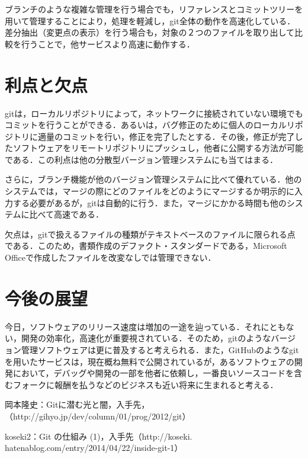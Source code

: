 \documentclass[a4j,9pt,twocolumn]{jsarticle}
\begin{document}
ブランチのような複雑な管理を行う場合でも，リファレンスとコミットツリーを用いて管理することにより，処理を軽減し，git全体の動作を高速化している．差分抽出（変更点の表示）を行う場合も，対象の２つのファイルを取り出して比較を行うことで，他サービスより高速に動作する．

\section{利点と欠点}
gitは，ローカルリポジトリによって，ネットワークに接続されていない環境でもコミットを行うことができる．あるいは，バグ修正のために個人のローカルリポジトリに適量のコミットを行い，修正を完了したとする．その後，修正が完了したソフトウェアをリモートリポジトリにプッシュし，他者に公開する方法が可能である．この利点は他の分散型バージョン管理システムにも当てはまる．

さらに，ブランチ機能が他のバージョン管理システムに比べて優れている．他のシステムでは，マージの際にどのファイルをどのようにマージするか明示的に入力する必要があるが，gitは自動的に行う．また，マージにかかる時間も他のシステムに比べて高速である．

欠点は，gitで扱えるファイルの種類がテキストベースのファイルに限られる点である．このため，書類作成のデファクト・スタンダードである，Microsoft Officeで作成したファイルを改変なしでは管理できない．

\section{今後の展望}
今日，ソフトウェアのリリース速度は増加の一途を辿っている．それにともない，開発の効率化，高速化が重要視されている．そのため，gitのようなバージョン管理ソフトウェアは更に普及すると考えられる．また，GitHubのようなgitを用いたサービスは，現在概ね無料で公開されているが，あるソフトウェアの開発において，デバッグや開発の一部を他者に依頼し，一番良いソースコードを含むフォークに報酬を払うなどのビジネスも近い将来に生まれると考える．

\small
\begin{thebibliography}{99}
岡本隆史：Gitに潜む光と闇，入手先，（http://gihyo.jp/dev/column/01/prog/2012/git）

koseki2：Git の仕組み (1)，入手先（http://koseki.\\hatenablog.com/entry/2014/04/22/inside-git-1）
\end{thebibliography}
\end{document}
